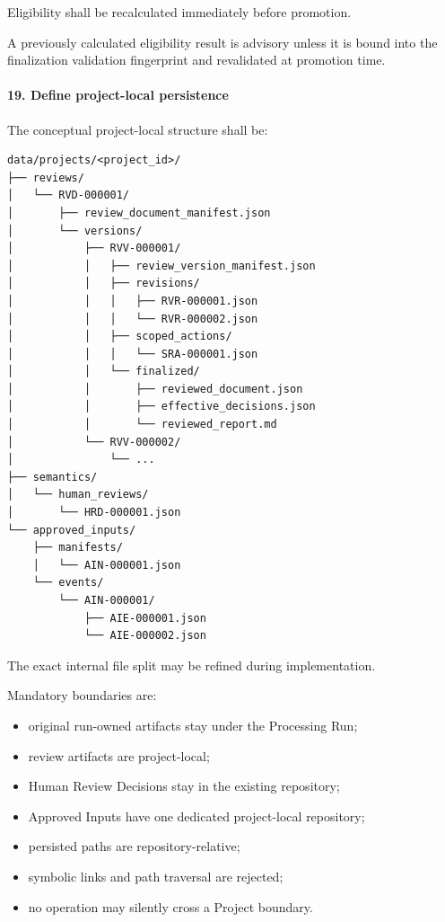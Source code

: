 Eligibility shall be recalculated immediately before promotion.

A previously calculated eligibility result is advisory unless it is bound into the finalization validation fingerprint and revalidated at promotion time.

\hypertarget{19-define-project-local-persistence}{%
\paragraph{19. Define project-local persistence}\label{19-define-project-local-persistence}}

The conceptual project-local structure shall be:

\begin{verbatim}
data/projects/<project_id>/
├── reviews/
│   └── RVD-000001/
│       ├── review_document_manifest.json
│       └── versions/
│           ├── RVV-000001/
│           │   ├── review_version_manifest.json
│           │   ├── revisions/
│           │   │   ├── RVR-000001.json
│           │   │   └── RVR-000002.json
│           │   ├── scoped_actions/
│           │   │   └── SRA-000001.json
│           │   └── finalized/
│           │       ├── reviewed_document.json
│           │       ├── effective_decisions.json
│           │       └── reviewed_report.md
│           └── RVV-000002/
│               └── ...
├── semantics/
│   └── human_reviews/
│       └── HRD-000001.json
└── approved_inputs/
    ├── manifests/
    │   └── AIN-000001.json
    └── events/
        └── AIN-000001/
            ├── AIE-000001.json
            └── AIE-000002.json
\end{verbatim}

The exact internal file split may be refined during implementation.

Mandatory boundaries are:

\begin{itemize}
\tightlist
\item
  original run-owned artifacts stay under the Processing Run;
\item
  review artifacts are project-local;
\item
  Human Review Decisions stay in the existing repository;
\item
  Approved Inputs have one dedicated project-local repository;
\item
  persisted paths are repository-relative;
\item
  symbolic links and path traversal are rejected;
\item
  no operation may silently cross a Project boundary.
\end{itemize}

